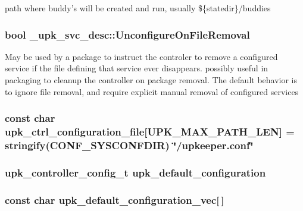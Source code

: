 path where buddy's will be created and run, usually \$\{statedir\}/buddies 
\subsubsection{\setlength{\rightskip}{0pt plus 5cm}bool \bf{\_\-upk\_\-svc\_\-desc::Unconfigure\-On\-File\-Removal}\hspace{0.3cm}{\tt  [inherited]}}\label{group__config__impl_g139b114940fe3a2e070e463bc3d4f838}


May be used by a package to instruct the controler to remove a configured service if the file defining that service ever disappears. possibly useful in packaging to cleanup the controller on package removal. The default behavior is to ignore file removal, and require explicit manual removal of configured services 
\subsubsection{\setlength{\rightskip}{0pt plus 5cm}const char \bf{upk\_\-ctrl\_\-configuration\_\-file}[UPK\_\-MAX\_\-PATH\_\-LEN] = stringify(CONF\_\-SYSCONFDIR) \char`\"{}/upkeeper.conf\char`\"{}}\label{group__config__impl_g8d40b48c45f9a4e84616919266172937}


\subsubsection{\setlength{\rightskip}{0pt plus 5cm}\bf{upk\_\-controller\_\-config\_\-t} \bf{upk\_\-default\_\-configuration}}\label{group__config__impl_g8faa02a740ec77a812eb1cb76cf2b832}


\subsubsection{\setlength{\rightskip}{0pt plus 5cm}const char \bf{upk\_\-default\_\-configuration\_\-vec}[$\,$]}\label{group__config__impl_g3ae0f79ba6093e24e304d95610ee1720}


